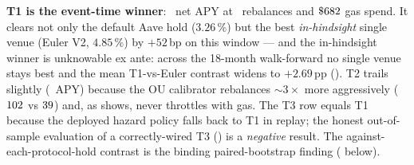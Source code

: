 \textbf{T1 is the event-time winner}: \TOneAPY\ net APY at
\TOneNRebal\ rebalances and $\$682$ gas spend.  It clears not
only the default Aave hold ($3.26$\,\%) but the best
\emph{in-hindsight} single venue (Euler V2, $4.85$\,\%) by $+52$\,bp
on this window --- and the in-hindsight winner is unknowable ex ante:
across the 18-month walk-forward no single venue stays best and the
mean T1-vs-Euler contrast widens to $+2.69$\,pp
().  T2 trails
slightly (\TTwoAPY\ APY) because the OU calibrator rebalances $\sim
3\times$ more aggressively ($102$ vs $39$) and, as
 shows, never throttles with gas.  The T3 row
equals T1 because the deployed hazard policy falls back to T1 in
replay; the honest out-of-sample evaluation of a correctly-wired T3
() is a \emph{negative} result.  The
against-each-protocol-hold contrast is the binding paired-bootstrap
finding ( below).

